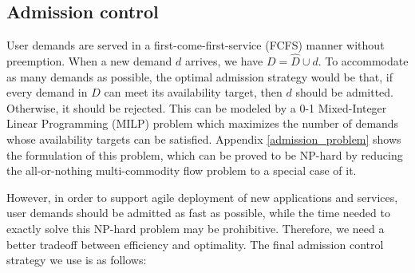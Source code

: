 \documentclass[sigconf]{acmart}
\begin{document}
\subsection {Admission control} \label{admission_control}
User demands are served in a first-come-first-service (FCFS) manner without preemption.
When a new demand $d$ arrives, we have $D= \hat{D} \cup {d}$.
To accommodate as many demands as possible, the optimal admission strategy would be that, 
if every demand in $D$ can meet its availability target, then $d$ should be admitted. 
Otherwise, it should be rejected.
This can be modeled by a 0-1 Mixed-Integer Linear Programming (MILP) problem which  
maximizes the number of demands whose availability targets can be satisfied.
Appendix \ref{admission_problem} shows the formulation of this problem, 
which can be proved to be NP-hard by reducing the all-or-nothing multi-commodity flow problem \cite{inproceedings2} to a special case of it.

However, in order to support agile deployment of new applications and services, 
user demands should be admitted as fast as possible, 
while the time needed to exactly solve this NP-hard problem may be prohibitive. 
Therefore, we need a better tradeoff between efficiency and optimality.
The final admission control strategy we use is as follows:

\end{document}
